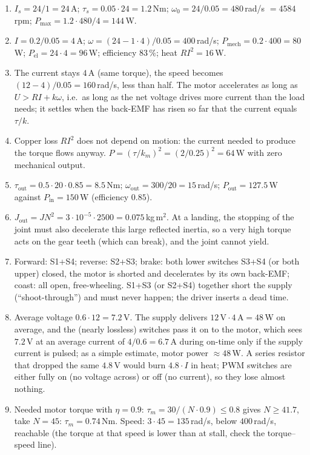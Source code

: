 \begin{enumerate}[label=\textbf{\ansnum.\arabic*}]
  \item $I_s=24/1=24$\,A; $\tau_s=0.05\cdot24=1.2$\,Nm; $\omega_0=24/0.05=480$\,rad/s $=4584$\,rpm; $P_\text{max}=1.2\cdot480/4=144$\,W.
  \item $I=0.2/0.05=4$\,A; $\omega=(24-1\cdot4)/0.05=400$\,rad/s; $P_\text{mech}=0.2\cdot400=80$\,W; $P_\text{el}=24\cdot4=96$\,W; efficiency $83\,\%$; heat $RI^2=16$\,W.
  \item The current stays $4$\,A (same torque), the speed becomes $(12-4)/0.05=160$\,rad/s, less than half. The motor accelerates as long as $U>R I+k\omega$, i.e.\ as long as the net voltage drives more current than the load needs; it settles when the back-EMF has risen so far that the current equals $\tau/k$.
  \item Copper loss $RI^2$ does not depend on motion: the current needed to produce the torque flows anyway. $P=(\tau/k_m)^2=(2/0.25)^2=64$\,W with zero mechanical output.
  \item $\tau_\text{out}=0.5\cdot20\cdot0.85=8.5$\,Nm; $\omega_\text{out}=300/20=15$\,rad/s; $P_\text{out}=127.5$\,W against $P_\text{in}=150$\,W (efficiency $0.85$).
  \item $J_\text{out}=J N^2=3\cdot10^{-5}\cdot2500=0.075$\,kg\,m$^2$. At a landing, the stopping of the joint must also decelerate this large reflected inertia, so a very high torque acts on the gear teeth (which can break), and the joint cannot yield.
  \item Forward: S1+S4; reverse: S2+S3; brake: both lower switches S3+S4 (or both upper) closed, the motor is shorted and decelerates by its own back-EMF; coast: all open, free-wheeling. S1+S3 (or S2+S4) together short the supply (``shoot-through'') and must never happen; the driver inserts a dead time.
  \item Average voltage $0.6\cdot12=7.2$\,V. The supply delivers $12\,\text{V}\cdot4\,\text{A}=48$\,W on average, and the (nearly lossless) switches pass it on to the motor, which sees $7.2$\,V at an average current of $4/0.6=6.7$\,A during on-time only if the supply current is pulsed; as a simple estimate, motor power $\approx48$\,W. A series resistor that dropped the same $4.8$\,V would burn $4.8\cdot I$ in heat; PWM switches are either fully on (no voltage across) or off (no current), so they lose almost nothing.
  \item Needed motor torque with $\eta=0.9$: $\tau_m=30/(N\cdot0.9)\le0.8$ gives $N\ge41.7$, take $N=45$: $\tau_m=0.74$\,Nm. Speed: $3\cdot45=135$\,rad/s, below $400$\,rad/s, reachable (the torque at that speed is lower than at stall, check the torque--speed line).

\end{enumerate}
